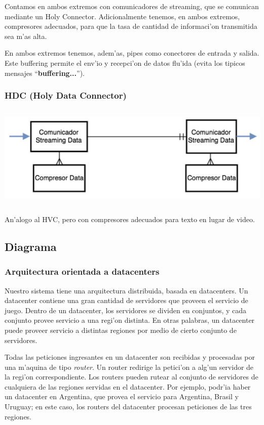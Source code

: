Contamos en ambos extremos con comunicadores de streaming, que se comunican mediante un Holy Connector. Adicionalmente tenemos, en ambos extremos, compresores adecuados, para que la tasa de cantidad de informaci'on transmitida sea m'as alta.

En ambos extremos tenemos, adem'as, pipes como conectores de entrada y salida. Este buffering permite el env'io y recepci'on de datos flu'ida (evita los tipicos mensajes ``\textbf{buffering...}'').


\subsubsection{HDC (Holy Data Connector)}

\includegraphics[height=5cm]{diagramas/HDC} 

An'alogo al HVC, pero con compresores adecuados para texto en lugar de video. 

\subsection{Diagrama}

\subsubsection{Arquitectura orientada a datacenters}

Nuestro sistema tiene una arquitectura distribuida, basada en datacenters. Un datacenter contiene una gran cantidad de servidores que proveen el servicio de juego. Dentro de un datacenter, los servidores se dividen en conjuntos, y cada conjunto provee servicio a una regi'on distinta. En otras palabras, un datacenter puede proveer servicio a distintas regiones por medio de cierto conjunto de servidores.

Todas las peticiones ingresantes en un datacenter son recibidas y procesadas por una m'aquina de tipo \textit{router}. Un router redirige la petici'on a alg'un servidor de la regi'on correspondiente. Los routers pueden rutear al conjunto de servidores de cualquiera de las regiones servidas en el datacenter. Por ejemplo, podr'ia haber un datacenter en Argentina, que provea el servicio para Argentina, Brasil y Uruguay; en este caso, los routers del datacenter procesan peticiones de las tres regiones.

